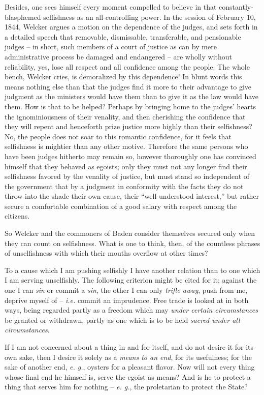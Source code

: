 \documentclass[12pt,a4paper]{book}
\begin{document}
Besides, one sees himself every moment compelled to believe in that 
constantly-blasphemed selfishness as an all-controlling power. In the session 
of February 10, 1844, Welcker argues a motion on the dependence of the judges, 
and sets forth in a detailed speech that removable, dismissable, transferable, 
and pensionable judges -- in short, such members of a court of justice as can 
by mere administrative process be damaged and endangered -- are wholly without 
reliability, yes, lose all respect and all confidence among the people. The 
whole bench, Welcker cries, is demoralized by this dependence! In blunt words 
this means nothing else than that the judges find it more to their advantage 
to give judgment as the ministers would have them than to give it as the law 
would have them. How is that to be helped? Perhaps by bringing home to the 
judges' hearts the ignominiousness of their venality, and then cherishing the 
confidence that they will repent and henceforth prize justice more highly than 
their selfishness? No, the people does not soar to this romantic confidence, 
for it feels that selfishness is mightier than any other motive. Therefore the 
same persons who have been judges hitherto may remain so, however thoroughly 
one has convinced himself that they behaved as egoists; only they must not any 
longer find their selfishness favored by the venality of justice, but must 
stand so independent of the government that by a judgment in conformity with 
the facts they do not throw into the shade their own cause, their 
``well-understood interest,'' but rather secure a comfortable combination of 
a good salary with respect among the citizens.

So Welcker and the commoners of Baden consider themselves secured only when 
they can count on selfishness. What is one to think, then, of the countless 
phrases of unselfishness with which their mouths overflow at other times?

To a cause which I am pushing selfishly I have another relation than to one 
which I am serving unselfishly. The following criterion might be cited for it; 
against the one I can \textit{sin} or commit a \textit{sin}, the other I can 
only \textit{trifle away}, push from me, deprive myself of -- \textit{i.e.} 
commit an imprudence. Free trade is looked at in both ways, being regarded 
partly as a freedom which may \textit{under certain circumstances} be granted 
or withdrawn, partly as one which is to be held \textit{sacred under all 
circumstances}.

If I am not concerned about a thing in and for itself, and do not desire it 
for its own sake, then I desire it solely as a \textit{means to an end}, for 
its usefulness; for the sake of another end, \textit{e. g.}, oysters for a 
pleasant flavor. Now will not every thing whose final end he himself is, serve 
the egoist as means? And is he to protect a thing that serves him for nothing 
-- \textit{e. g.}, the proletarian to protect the State?
\end{document}
